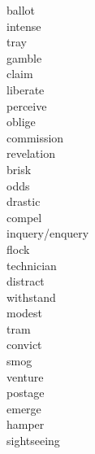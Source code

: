 \documentclass[b5paper, 11pt]{ctexart}
\begin{document}
\begin{multicols*}{3}
\begin{description}
\item[ballot]

\item[intense]

\item[tray]

\item[gamble]

\item[claim]

\item[liberate]

\item[perceive]

\item[oblige]

\item[commission]

\item[revelation]

\item[brisk]

\item[odds]

\item[drastic]

\item[compel]

\item[inquery/enquery]

\item[flock]

\item[technician]

\item[distract]

\item[withstand]

\item[modest]

\item[tram]

\item[convict]

\item[smog]

\item[venture]

\item[postage]

\item[emerge]

\item[hamper]

\item[sightseeing]


\end{description}
\end{multicols*}
\end{document}
